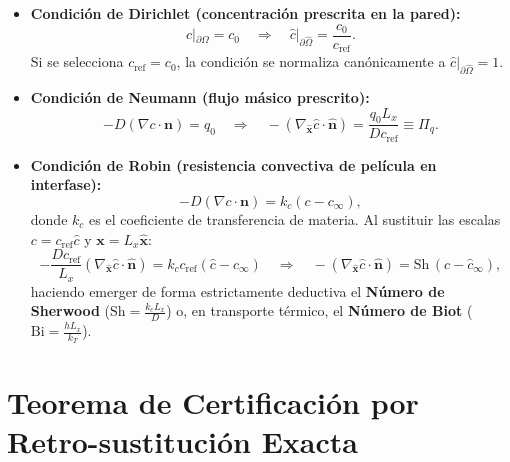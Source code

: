 \documentclass[11pt,a4paper]{article}
\begin{document}
\begin{itemize}
    \item \textbf{Condición de Dirichlet (concentración prescrita en la pared):}
    \begin{equation}
    c|_{\partial\Omega} = c_0 \quad \Longrightarrow \quad \hat{c}|_{\partial\hat{\Omega}} = \frac{c_0}{c_{\mathrm{ref}}}.
    \end{equation}
    Si se selecciona $c_{\mathrm{ref}} = c_0$, la condición se normaliza canónicamente a $\hat{c}|_{\partial\hat{\Omega}} = 1$.

    \item \textbf{Condición de Neumann (flujo másico prescrito):}
    \begin{equation}
    -D (\nabla c \cdot \mathbf{n}) = q_0 \quad \Longrightarrow \quad -(\nabla_{\hat{\mathbf{x}}} \hat{c} \cdot \hat{\mathbf{n}}) = \frac{q_0 L_x}{D c_{\mathrm{ref}}} \equiv \Pi_q.
    \end{equation}

    \item \textbf{Condición de Robin (resistencia convectiva de película en interfase):}
    \begin{equation}
    -D (\nabla c \cdot \mathbf{n}) = k_c (c - c_\infty),
    \end{equation}
    donde $k_c$ es el coeficiente de transferencia de materia. Al sustituir las escalas $c = c_{\mathrm{ref}} \hat{c}$ y $\mathbf{x} = L_x \hat{\mathbf{x}}$:
    \begin{equation}
    -\frac{D c_{\mathrm{ref}}}{L_x} (\nabla_{\hat{\mathbf{x}}} \hat{c} \cdot \hat{\mathbf{n}}) = k_c c_{\mathrm{ref}} (\hat{c} - \hat{c}_\infty) \quad \Longrightarrow \quad -(\nabla_{\hat{\mathbf{x}}} \hat{c} \cdot \hat{\mathbf{n}}) = \mathrm{Sh} \, (\hat{c} - \hat{c}_\infty),
    \end{equation}
    haciendo emerger de forma estrictamente deductiva el \textbf{Número de Sherwood} ($\mathrm{Sh} = \frac{k_c L_x}{D}$) o, en transporte térmico, el \textbf{Número de Biot} ($\mathrm{Bi} = \frac{h L_x}{k_T}$).
\end{itemize}

\section{Teorema de Certificación por Retro-sustitución Exacta}
\end{document}
